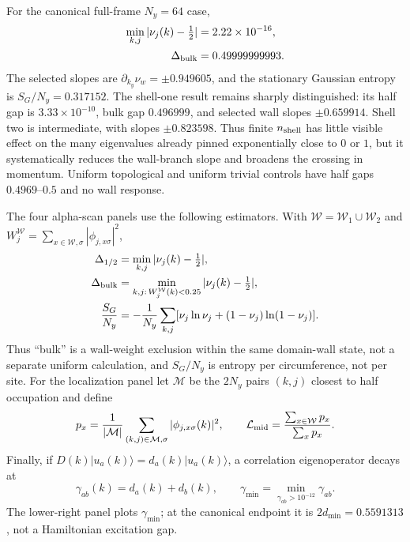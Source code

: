 \documentclass[aps,prb,twocolumn,nofootinbib,superscriptaddress,floatfix]{revtex4-2}
\begin{document}
For the canonical full-frame $N_y=64$ case,
\begin{align}
 \min_{k,j}|\nu_j(k)-\tfrac12|&=2.22\times10^{-16},\nonumber\\
 \Delta_{\rm bulk}&=0.49999999993.
\end{align}
The selected slopes are $\partial_{k_y}\nu_w=\pm0.949605$, and the stationary
Gaussian entropy is $S_G/N_y=0.317152$. The shell-one result remains sharply
distinguished: its half gap is $3.33\times10^{-10}$, bulk gap $0.496999$, and
selected wall slopes $\pm0.659914$. Shell two is intermediate, with slopes
$\pm0.823598$. Thus finite $n_{\rm shell}$ has little visible effect on the
many eigenvalues already pinned exponentially close to $0$ or $1$, but it
systematically reduces the wall-branch slope and broadens the crossing in
momentum. Uniform topological and uniform trivial
controls have half gaps $0.4969$--$0.5$ and no wall response.

The four alpha-scan panels use the following estimators. With
$\mathcal W=\mathcal W_1\cup\mathcal W_2$ and
$W_j^{\mathcal W}=\sum_{x\in\mathcal W,\sigma}|\phi_{j,x\sigma}|^2$,
\begin{align}
 \Delta_{1/2}&=\min_{k,j}|\nu_j(k)-\tfrac12|,\nonumber\\
 \Delta_{\rm bulk}&=\min_{k,j:\,W_j^{\mathcal W}(k)<0.25}
 |\nu_j(k)-\tfrac12|,\label{eq:alphagaps}\\
 \frac{S_G}{N_y}&=-\frac1{N_y}\sum_{k,j}
 [\nu_j\ln\nu_j+(1-\nu_j)\ln(1-\nu_j)].
 \label{eq:entropyestimator}
\end{align}
Thus ``bulk'' is a wall-weight exclusion within the same domain-wall state,
not a separate uniform calculation, and $S_G/N_y$ is entropy per circumference,
not per site. For the localization panel let $\mathcal M$ be the $2N_y$ pairs
$(k,j)$ closest to half occupation and define
\begin{equation}
 p_x=\frac1{|\mathcal M|}\sum_{(k,j)\in\mathcal M,\sigma}
 |\phi_{j,x\sigma}(k)|^2,\qquad
 \mathcal L_{\rm mid}=\frac{\sum_{x\in\mathcal W}p_x}{\sum_xp_x}.
 \label{eq:midgaplocalization}
\end{equation}
Finally, if $D(k)|u_a(k)\rangle=d_a(k)|u_a(k)\rangle$, a correlation
eigenoperator decays at
\begin{equation}
 \gamma_{ab}(k)=d_a(k)+d_b(k),\qquad
 \gamma_{\min}=\min_{\gamma_{ab}>10^{-12}}\gamma_{ab}.
 \label{eq:correlationrate}
\end{equation}
The lower-right panel plots $\gamma_{\min}$; at the canonical endpoint it is
$2d_{\min}=0.5591313$, not a Hamiltonian excitation gap.
\end{document}
